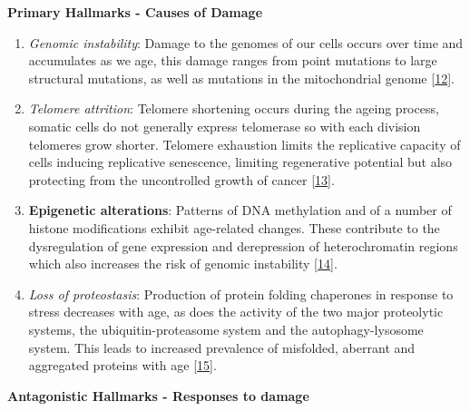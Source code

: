 \documentclass[
]{book}
\begin{document}
\textbf{Primary Hallmarks - Causes of Damage}

\begin{enumerate}
\def\labelenumi{\arabic{enumi}.}
\item
  \emph{Genomic instability}:
  Damage to the genomes of our cells occurs over time and accumulates as we age, this damage ranges from point mutations to large structural mutations, as well as mutations in the mitochondrial genome {[}\protect\hyperlink{ref-Niedernhofer2018}{12}{]}.
\item
  \emph{Telomere attrition}:
  Telomere shortening occurs during the ageing process, somatic cells do not generally express telomerase so with each division telomeres grow shorter.
  Telomere exhaustion limits the replicative capacity of cells inducing replicative senescence, limiting regenerative potential but also protecting from the uncontrolled growth of cancer {[}\protect\hyperlink{ref-Casagrande2019}{13}{]}.
\item
  \textbf{Epigenetic alterations}:
  Patterns of DNA methylation and of a number of histone modifications exhibit age-related changes. These contribute to the dysregulation of gene expression and derepression of heterochromatin regions which also increases the risk of genomic instability {[}\protect\hyperlink{ref-Saldanha2015}{14}{]}.
\item
  \emph{Loss of proteostasis}:
  Production of protein folding chaperones in response to stress decreases with age, as does the activity of the two major proteolytic systems, the ubiquitin-proteasome system and the autophagy-lysosome system.
  This leads to increased prevalence of misfolded, aberrant and aggregated proteins with age {[}\protect\hyperlink{ref-Santra2019}{15}{]}.
\end{enumerate}

\textbf{Antagonistic Hallmarks - Responses to damage}
\end{document}
